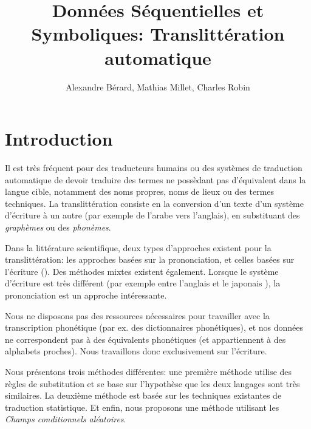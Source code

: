 \documentclass{article}
\begin{document}
\title{Données Séquentielles et Symboliques: Translittération automatique}

\author{Alexandre Bérard, Mathias Millet, Charles Robin}
\maketitle
\begin{abstract}
\end{abstract}
\vspace{0.5em}
\section{Introduction}

Il est très fréquent pour des traducteurs humains ou des systèmes de traduction automatique de devoir traduire des termes ne possèdant pas d'équivalent dans la langue cible, notamment des noms propres, noms de lieux ou des termes techniques.
La translittération consiste en la conversion d'un texte d'un système d'écriture à un autre (par exemple de l'arabe vers l'anglais), en substituant des \emph{graphèmes} ou des \emph{phonèmes}.

Dans la littérature scientifique, deux types d'approches existent pour la translittération: les approches basées sur la prononciation, et celles basées sur l'écriture (\cite{OhChoi06}). Des méthodes mixtes existent également. Lorsque le système d'écriture est très différent (par exemple entre l'anglais et le japonais \cite{Knight98}), la prononciation est un approche intéressante.

Nous ne disposons pas des ressources nécessaires pour travailler avec la transcription phonétique (par ex. des dictionnaires phonétiques), et nos données ne correspondent pas à des équivalents phonétiques (et appartiennent à des alphabets proches). Nous travaillons donc exclusivement sur l'écriture.


Nous présentons trois méthodes différentes: une première méthode utilise des règles de substitution et se base sur l'hypothèse que les deux langages sont très similaires. La deuxième méthode est basée sur les techniques existantes de traduction statistique. Et enfin, nous proposons une méthode utilisant les \emph{Champs conditionnels aléatoires}.
\end{document}

